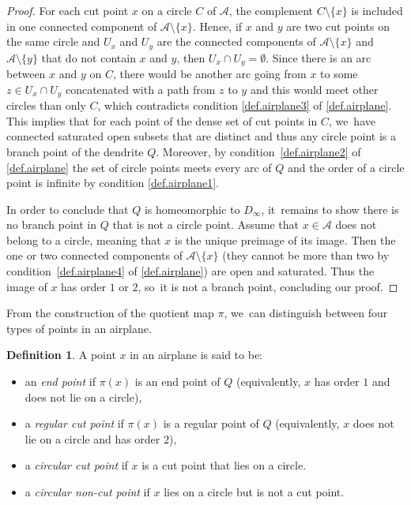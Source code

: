\documentclass[JEP,XML,SOM,Unicode,NoFloatCountersInSection,published]{cedram}
\theoremstyle{plain}
\theoremstyle{definition}
\newtheorem{definition}[theorem]{Definition}
\theoremstyle{remark}
\newcommand{\A}{\mathcal{A}}
\begin{document}
\begin{proof}
For each cut point $x$ on a circle $C$ of $\A$, the complement $C \setminus \{x\}$ is included in one connected component of $\A \setminus \{x\}$.
Hence, if $x$ and $y$ are two cut points on the same circle and $U_x$ and $U_y$ are the connected components of $\A\setminus\{x\}$ and $\A\setminus\{y\}$ that do not contain $x$ and $y$, then $U_x \cap U_y = \emptyset$.
Since there is an arc between $x$ and $y$ on $C$, there would be another arc going from $x$ to some $z\in U_x\cap U_y$ concatenated with a path from $z$ to $y$ and this would meet other circles than only $C$, which contradicts condition \cref{def.airplane3} of \cref{def.airplane}.
This implies that for each point of the dense set of cut points in $C$, we~have connected saturated open subsets that are distinct and thus any circle point is a branch point of the dendrite $Q$.
Moreover, by condition~\cref{def.airplane2} of \cref{def.airplane} the set of circle points meets every arc of $Q$ and the order of a circle point is infinite by condition \cref{def.airplane1}.

In order to conclude that $Q$ is homeomorphic to $D_\infty$, it~remains to show there is no branch point in $Q$ that is not a circle point.
Assume that $x \in \A$ does not belong to a circle, meaning that $x$ is the unique preimage of its image.
Then the one or two connected components of $\A \setminus \{x\}$ (they cannot be more than two by condition~\cref{def.airplane4} of \cref{def.airplane}) are open and saturated.
Thus the image of $x$ has order $1$ or $2$, so~it is not a branch point, concluding our proof.
\end{proof}

From the construction of the quotient map $\pi$, we~can distinguish between four types of points in an airplane.

\begin{definition}
\label{def.points.airplane}
A point $x$ in an airplane is said to be:
\begin{itemize}
\item an \emph{end point} if $\pi(x)$ is an end point of $Q$ (equivalently, $x$ has order $1$ and does not lie on a circle),
\item a \emph{regular cut point} if $\pi(x)$ is a regular point of $Q$ (equivalently, $x$ does not lie on a circle and has order $2$),
\item a \emph{circular cut point} if $x$ is a cut point that lies on a circle.
\item a \emph{circular non-cut point} if $x$ lies on a circle but is not a cut point.
\end{itemize}
\end{definition}
\end{document}
